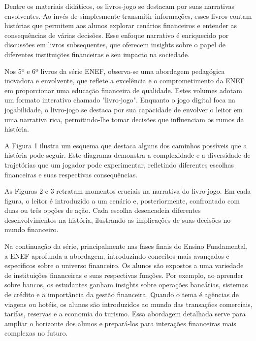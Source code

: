 Dentre os materiais didáticos, os livros-jogo se destacam por suas narrativas envolventes. Ao invés de simplesmente transmitir informações, esses livros contam histórias que permitem aos alunos explorar cenários financeiros e entender as consequências de várias decisões. Esse enfoque narrativo é enriquecido por discussões em livros subsequentes, que oferecem insights sobre o papel de diferentes instituições financeiras e seu impacto na sociedade.

Nos 5º e 6º livros da série ENEF, observa-se uma abordagem pedagógica inovadora e envolvente, que reflete a excelência e o comprometimento da ENEF em proporcionar uma educação financeira de qualidade. Estes volumes adotam um formato interativo chamado "livro-jogo". Enquanto o jogo digital foca na jogabilidade, o livro-jogo se destaca por sua capacidade de envolver o leitor em uma narrativa rica, permitindo-lhe tomar decisões que influenciam os rumos da história.

A Figura 1 ilustra um esquema que destaca alguns dos caminhos possíveis que a história pode seguir. Este diagrama demonstra a complexidade e a diversidade de trajetórias que um jogador pode experimentar, refletindo diferentes escolhas financeiras e suas respectivas consequências.

As Figuras 2 e 3 retratam momentos cruciais na narrativa do livro-jogo. Em cada figura, o leitor é introduzido a um cenário e, posteriormente, confrontado com duas ou três opções de ação. Cada escolha desencadeia diferentes desenvolvimentos na história, ilustrando as implicações de suas decisões no mundo financeiro.

Na continuação da série, principalmente nas fases finais do Ensino Fundamental, a ENEF aprofunda a abordagem, introduzindo conceitos mais avançados e específicos sobre o universo financeiro. Os alunos são expostos a uma variedade de instituições financeiras e suas respectivas funções. Por exemplo, ao aprender sobre bancos, os estudantes ganham insights sobre operações bancárias, sistemas de crédito e a importância da gestão financeira. Quando o tema é agências de viagens ou hotéis, os alunos são introduzidos ao mundo das transações comerciais, tarifas, reservas e a economia do turismo. Essa abordagem detalhada serve para ampliar o horizonte dos alunos e prepará-los para interações financeiras mais complexas no futuro.

